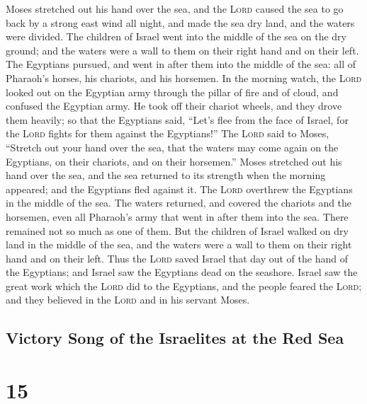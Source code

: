  Moses stretched out his hand over the sea, and the
\textsc{Lord} caused the sea to go back by a strong east wind all night,
and made the sea dry land, and the waters were divided. 
The children of Israel went into the middle of the sea on the dry
ground; and the waters were a wall to them on their right hand and on
their left.  The Egyptians pursued, and went in after
them into the middle of the sea: all of Pharaoh's horses, his chariots,
and his horsemen.  In the morning watch, the
\textsc{Lord} looked out on the Egyptian army through the pillar of fire
and of cloud, and confused the Egyptian army.  He took
off their chariot wheels, and they drove them heavily; so that the
Egyptians said, ``Let's flee from the face of Israel, for the
\textsc{Lord} fights for them against the Egyptians!'' 
The \textsc{Lord} said to Moses, ``Stretch out your hand over the sea,
that the waters may come again on the Egyptians, on their chariots, and
on their horsemen.''  Moses stretched out his hand over
the sea, and the sea returned to its strength when the morning appeared;
and the Egyptians fled against it. The \textsc{Lord} overthrew the
Egyptians in the middle of the sea.  The waters returned,
and covered the chariots and the horsemen, even all Pharaoh's army that
went in after them into the sea. There remained not so much as one of
them.  But the children of Israel walked on dry land in
the middle of the sea, and the waters were a wall to them on their right
hand and on their left.  Thus the \textsc{Lord} saved
Israel that day out of the hand of the Egyptians; and Israel saw the
Egyptians dead on the seashore.  Israel saw the great
work which the \textsc{Lord} did to the Egyptians, and the people feared
the \textsc{Lord}; and they believed in the \textsc{Lord} and in his
servant Moses.

\hypertarget{victory-song-of-the-israelites-at-the-red-sea}{%
\subsection{Victory Song of the Israelites at the Red
Sea}\label{victory-song-of-the-israelites-at-the-red-sea}}

\hypertarget{section-14}{%
\section{15}\label{section-14}}

